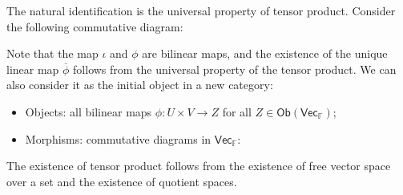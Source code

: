 \documentclass[
	11pt, %
	fleqn, %
	a4paper, %
]{LegrandOrangeBook}
\renewcommand{\bar}[1]{\overline{#1}} %
\newcommand{\F}{\mathbb{F}} %
\newcommand{\Vect}{\boldsymbol{\mathsf{Vec}}} %
\newcommand{\Ob}[1]{\mathsf{Ob}(#1)} %
\begin{document}
The natural identification is the universal property of tensor product. Consider the following commutative diagram:
\begin{center}
\end{center}
Note that the map $\iota$ and $\phi$ are bilinear maps, and the existence of the unique linear map $\bar{\phi}$ follows from the universal property of the tensor product. We can also consider it as the initial object in a new category:
\begin{itemize}
    \item Objects: all bilinear maps $\phi : U \times V \to Z$ for all $Z \in \Ob{\Vect_{\F}}$;
    \item Morphisms: commutative diagrams in $\Vect_{\F}$:
\end{itemize}
\begin{center}
\end{center}

The existence of tensor product follows from the existence of free vector space over a set and the existence of quotient spaces. 
\end{document}
